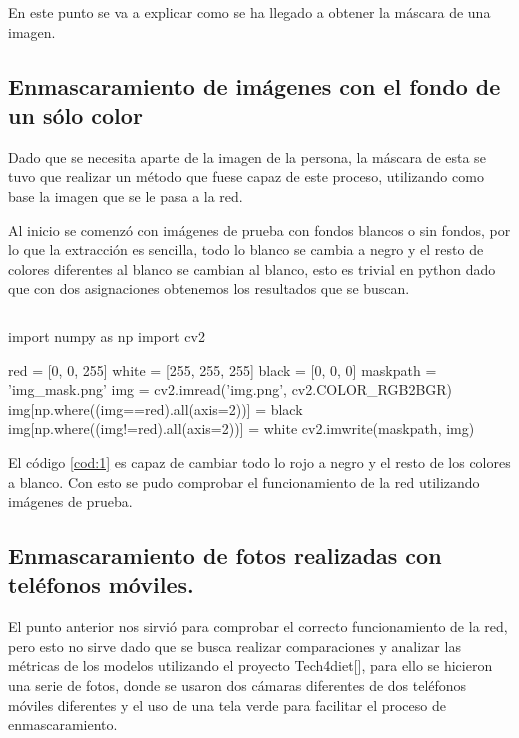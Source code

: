 En este punto se va a explicar como se ha llegado a obtener la máscara de una imagen.

\subsection{Enmascaramiento de imágenes con el fondo de un sólo color}

Dado que se necesita aparte de la imagen de la persona, la máscara de esta se tuvo que realizar un método que fuese capaz de este proceso, utilizando como base la imagen que se le pasa a la red.

Al inicio se comenzó con imágenes de prueba con fondos blancos o sin fondos, por lo que la extracción es sencilla, todo lo blanco se cambia a negro y el resto de colores diferentes al blanco se cambian al blanco, esto es trivial en python dado que con dos asignaciones obtenemos los resultados que se buscan.
\clearpage
\begin{lstlisting}[caption={Código obtención máscara 1}, label=cod:1]
\end{lstlisting}
\begin{python}
	import numpy as np
	import cv2 
	
	red = [0, 0, 255]
	white = [255, 255, 255]
	black = [0, 0, 0]
	maskpath = 'img_mask.png'
	img = cv2.imread('img.png', cv2.COLOR_RGB2BGR)
	img[np.where((img==red).all(axis=2))] = black
	img[np.where((img!=red).all(axis=2))] = white
	cv2.imwrite(maskpath, img)
\end{python}

El código \ref{cod:1} es capaz de cambiar todo lo rojo a negro y el resto de los colores a blanco.
Con esto se pudo comprobar el funcionamiento de la red utilizando imágenes de prueba.

\subsection{Enmascaramiento de fotos realizadas con teléfonos móviles.}

El punto anterior nos sirvió para comprobar el correcto funcionamiento de la red, pero esto no sirve dado que se busca realizar comparaciones y analizar las métricas de los modelos utilizando el proyecto Tech4diet[\cite{tech}], para ello se hicieron una serie de fotos, donde se usaron dos cámaras diferentes de dos teléfonos móviles diferentes y el uso de una tela verde para facilitar el proceso de enmascaramiento.



